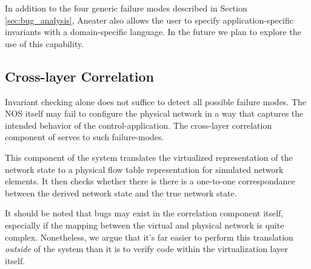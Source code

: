 In addition to the four generic failure modes described in Section
\ref{sec:bug_analysis}, Aneater also allows the user to specify
application-specific invariants with a domain-specific language. In the future
we plan to explore the use of this capability.

\subsection{Cross-layer Correlation}
\label{sec:cross_layer_correlation}

Invariant checking alone does not suffice to detect all possible failure
modes. The NOS itself may fail to configure the physical network in a way that
captures the intended behavior of the control-application. The cross-layer correlation
component of \projectname{} serves to such failure-modes. 

This component of the system translates the
virtualized representation of the network state to a physical flow table
representation for simulated network elements. It then checks whether there is
there is a one-to-one correspondance between the derived network
state and the true network state.

It should be noted that bugs may exist in the correlation component itself,
especially if the mapping between the virtual and physical network is quite
complex. Nonetheless, we argue that it's far easier to perform this
translation {\it outside} of the system than it is to verify code within the
virtualization layer itself.



